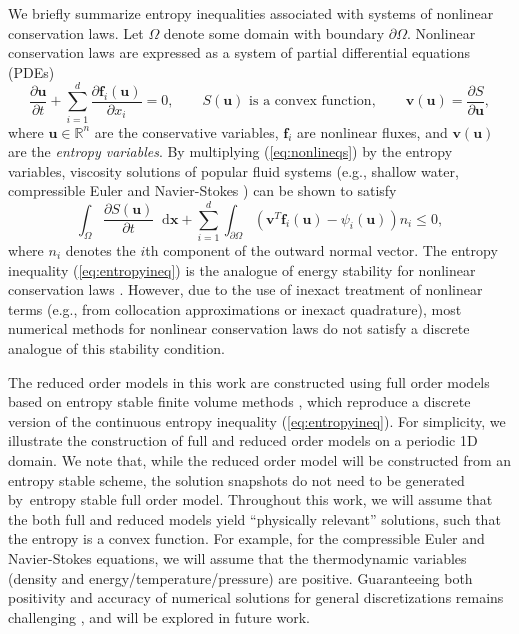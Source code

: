 \documentclass[preprint,10pt]{elsarticle}
\theoremstyle{definition}
\theoremstyle{lemma}
\theoremstyle{theorem}
\theoremstyle{assumption}
\newcommand*\diff[1]{\mathop{}\!{\mathrm{d}#1}}
\newcommand{\pd}[2]{\frac{\partial#1}{\partial#2}}
\newcommand{\LRp}[1]{\left( #1 \right)}
\begin{document}
We briefly summarize entropy inequalities associated with systems of nonlinear conservation laws.  Let $\Omega$ denote some domain with boundary $\partial \Omega$.  Nonlinear conservation laws are expressed as a system of partial differential equations (PDEs) 
\begin{equation}
\pd{\bm{u}}{t}  + \sum_{i=1}^d\pd{\bm{f}_i(\bm{u})}{x_i} = 0, \qquad 
S(\bm{u}) \text{ is a convex function}, \qquad
\bm{v}(\bm{u}) = \pd{S}{\bm{u}},
\label{eq:nonlineqs}
\end{equation}
where $\bm{u}\in \mathbb{R}^n$ are the conservative variables, $\bm{f}_i$ are nonlinear fluxes, and $\bm{v}(\bm{u})$ are the \textit{entropy variables}.  By multiplying (\ref{eq:nonlineqs}) by the entropy variables, viscosity solutions \cite{oleinik1957discontinuous, kruvzkov1970first}  of popular fluid systems (e.g., shallow water, compressible Euler and Navier-Stokes \cite{hughes1986new, chen2017entropy}) can be shown to satisfy 
\begin{equation}
\int_{\Omega}\pd{S(\bm{u})}{t}\diff{\bm{x}} + \sum_{i=1}^d \int_{\partial \Omega} \LRp{\bm{v}^T\bm{f}_i(\bm{u}) - \psi_i(\bm{u})}n_i \leq 0\label{eq:entropyineq},
\end{equation}
where $n_i$ denotes the $i$th component of the outward normal vector.  
The entropy inequality (\ref{eq:entropyineq}) is the analogue of energy stability for nonlinear conservation laws \cite{mock1980systems, harten1983symmetric}.  
However, due to the use of inexact treatment of nonlinear terms (e.g., from collocation approximations or inexact quadrature), most numerical methods for nonlinear conservation laws do not satisfy a discrete analogue of this stability condition.  

The reduced order models in this work are constructed using full order models based on entropy stable finite volume methods \cite{tadmor1987numerical}, which reproduce a discrete version of the continuous entropy inequality (\ref{eq:entropyineq}).  For simplicity, we illustrate the construction of full and reduced order models on a periodic 1D domain.  We note that, while the reduced order model will be constructed from an entropy stable scheme, the solution snapshots do not need to be generated by entropy stable full order model.  Throughout this work, we will assume that the both full and reduced models yield ``physically relevant'' solutions, such that the entropy is a convex function.  For example, for the compressible Euler and Navier-Stokes equations, we will assume that the thermodynamic variables (density and energy/temperature/pressure) are positive.  Guaranteeing both positivity and accuracy of numerical solutions for general discretizations remains challenging \cite{guermond2016invariant, guermond2019invariant}, and will be explored in future work.
\end{document}

